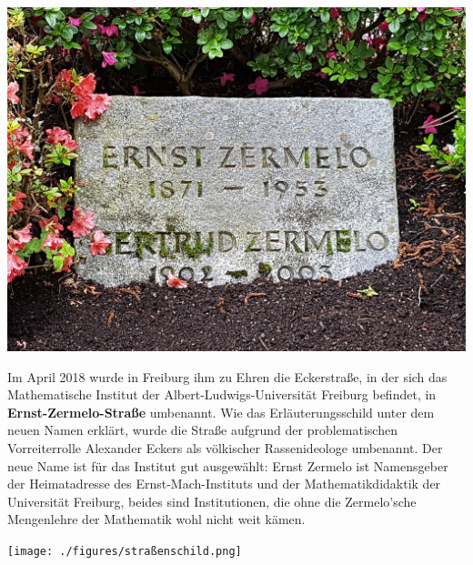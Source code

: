 \documentclass[landscape, a4paper]{article}
\newcommand\alert[1]{\textcolor{PrimaryColor}{\textbf{#1}}}
\begin{document}
\begin{minipage}[t]{0.31\textwidth}
	\vspace{0cm}
	\setlength{\parskip}{0.25cm}

	\includegraphics[width=\linewidth]{./figures/grabstein.png}
	\setlength{\parskip}{0.25cm}

	Im April 2018 wurde in Freiburg ihm zu Ehren die Eckerstraße, in der sich das Mathematische Institut der Albert-Ludwigs-Universität Freiburg befindet, in \alert{Ernst-Zermelo-Straße} umbenannt. Wie das Erläuterungsschild unter dem neuen Namen erklärt, wurde die Straße aufgrund der problematischen Vorreiterrolle Alexander Eckers als völkischer Rassenideologe umbenannt. Der neue Name ist für das Institut gut ausgewählt: Ernst Zermelo ist Namensgeber der Heimatadresse des Ernst-Mach-Instituts und der Mathematikdidaktik der Universität Freiburg, beides sind Institutionen, die ohne die Zermelo’sche Mengenlehre der Mathematik wohl nicht weit kämen. %

	\texttt{[image: ./figures/straßenschild.png]}
	\setlength{\parskip}{0.25cm}
\end{minipage}%
\hfill%
\vrule width 0.01cm
\hfill%
\end{document}
